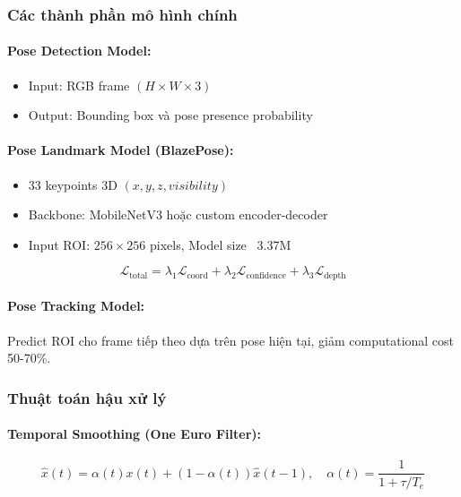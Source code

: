 \subsubsection{Các thành phần mô hình chính}

\paragraph{Pose Detection Model:}
\begin{itemize}
    \item Input: RGB frame $(H \times W \times 3)$
    \item Output: Bounding box và pose presence probability
\end{itemize}

\paragraph{Pose Landmark Model (BlazePose):}
\begin{itemize}
    \item 33 keypoints 3D $(x, y, z, visibility)$
    \item Backbone: MobileNetV3 hoặc custom encoder-decoder
    \item Input ROI: $256 \times 256$ pixels, Model size ~3.37M
\end{itemize}

\begin{equation}
\mathcal{L}_{\text{total}} = \lambda_1 \mathcal{L}_{\text{coord}} + \lambda_2 \mathcal{L}_{\text{confidence}} + \lambda_3 \mathcal{L}_{\text{depth}}
\end{equation}

\paragraph{Pose Tracking Model:} Predict ROI cho frame tiếp theo dựa trên pose hiện tại, giảm computational cost 50-70\%.

\subsubsection{Thuật toán hậu xử lý}

\paragraph{Temporal Smoothing (One Euro Filter):}
\begin{equation}
\hat{x}(t) = \alpha(t) x(t) + (1-\alpha(t)) \hat{x}(t-1), \quad
\alpha(t) = \frac{1}{1 + \tau / T_e}
\end{equation}

